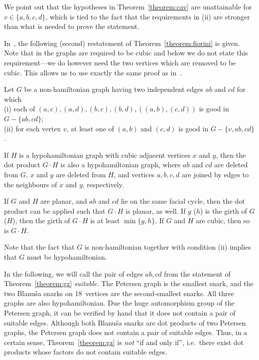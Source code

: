 \documentclass{amcjoucc}
\begin{document}
We point out that the hypotheses in Theorem~\ref{theorem:cav} are unattainable for $v \in \{ a,b,c,d \}$, which is tied to the fact that the requirements in (ii) are stronger than what is needed to prove the statement.

In~\cite{GZ}, the following (second) restatement of Theorem~\ref{theorem:fiorini} is given. Note that in \cite{GZ} the graphs are required to be cubic and below we do not state this requirement---we do however need the two vertices which are removed to be cubic. This allows us to use exactly the same proof as in~\cite{GZ}.

\begin{theorem}\label{theorem:gz}
Let $G$ be a non-hamiltonian graph having two independent edges $ab$ and $cd$ for which\\
(i) each of $(a,c), (a,d), (b,c), (b,d), ((a,b),(c,d))$ is good in $G - \{ ab, cd \}$;\\
(ii) for each vertex $v$, at least one of $(a,b)$ and $(c,d)$ is good in $G - \{ v, ab, cd \}$.\par
If $H$ is a hypohamiltonian graph with cubic adjacent vertices $x$ and $y$, then the dot product $G \cdot H$ is also a hypohamiltonian graph, where $ab$ and $cd$ are deleted from $G$, $x$ and $y$ are deleted from $H$, and vertices $a, b, c, d$ are joined by edges to the neighbours of $x$ and $y$, respectively.\par
If $G$ and $H$ are planar, and $ab$ and $cd$ lie on the same facial cycle, then the dot product can be applied such that $G \cdot H$ is planar, as well. If $g$ ($h$) is the girth of $G$ ($H$), then the girth of $G \cdot H$ is at least $\min \{ g, h \}$. If $G$ and $H$ are cubic, then so is $G \cdot H.$
\end{theorem}

Note that the fact that $G$ is non-hamiltonian together with condition (ii) implies that $G$ must be hypohamiltonian.


In the following, we will call the pair of edges $ab, cd$ from the statement of Theorem~\ref{theorem:gz} \emph{suitable}. The Petersen graph is the smallest snark, and the two Blanu\v{s}a snarks on 18~vertices are the second-smallest snarks. All three graphs are also hypohamiltonian. Due the huge automorphism group of the Petersen graph, it can be verified by hand that it does not contain a pair of suitable edges. Although both Blanu\v{s}a snarks are dot products of two Petersen graphs, the Petersen graph does not contain a pair of suitable edges. Thus, in a certain sense, Theorem~\ref{theorem:gz} is \emph{not} ``if and only if'', i.e.\ there exist dot products whose factors do not contain suitable edges.
\end{document}
